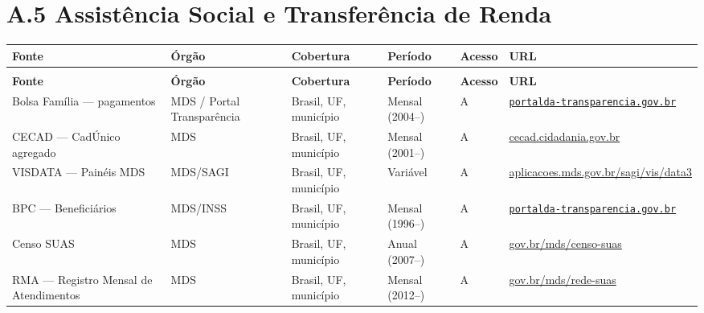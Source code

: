 \section*{A.5 Assistência Social e Transferência de Renda}

{\setlength{\tabcolsep}{3pt}\footnotesize\begin{longtable}{@{} >{\raggedright\arraybackslash}p{2.9cm} >{\raggedright\arraybackslash}p{2.3cm} >{\raggedright\arraybackslash}p{2.4cm} >{\raggedright\arraybackslash}p{2.4cm} >{\raggedright\arraybackslash}p{1.1cm} >{\raggedright\arraybackslash}p{3.2cm} @{}}
\toprule
\textbf{Fonte} & \textbf{Órgão} & \textbf{Cobertura} & \textbf{Período} & \textbf{Acesso} & \textbf{URL} \\
\midrule
\endfirsthead
\multicolumn{6}{l}{\small\textit{(continuação)}} \\
\toprule
\textbf{Fonte} & \textbf{Órgão} & \textbf{Cobertura} & \textbf{Período} & \textbf{Acesso} & \textbf{URL} \\
\midrule
\endhead
\bottomrule
\endfoot

Bolsa Família --- pagamentos
  & MDS / Portal Transparência
  & Brasil, UF, município
  & Mensal (2004--)
  & A
  & \href{https://portaldatransparencia.gov.br}{\nolinkurl{portalda-transparencia.gov.br}} \\

CECAD --- CadÚnico agregado
  & MDS
  & Brasil, UF, município
  & Mensal (2001--)
  & A
  & \url{cecad.cidadania.gov.br} \\

VISDATA --- Painéis MDS
  & MDS/SAGI
  & Brasil, UF, município
  & Variável
  & A
  & \url{aplicacoes.mds.gov.br/sagi/vis/data3} \\

BPC --- Beneficiários
  & MDS/INSS
  & Brasil, UF, município
  & Mensal (1996--)
  & A
  & \href{https://portaldatransparencia.gov.br}{\nolinkurl{portalda-transparencia.gov.br}} \\

Censo SUAS
  & MDS
  & Brasil, UF, município
  & Anual (2007--)
  & A
  & \url{gov.br/mds/censo-suas} \\

RMA --- Registro Mensal de Atendimentos
  & MDS
  & Brasil, UF, município
  & Mensal (2012--)
  & A
  & \url{gov.br/mds/rede-suas} \\

\end{longtable}}

